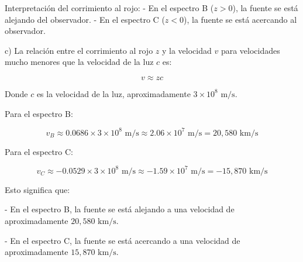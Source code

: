 \documentclass[12pt]{article}
\begin{document}
Interpretación del corrimiento al rojo:
- En el espectro B (\( z > 0 \)), la fuente se está alejando del observador.
- En el espectro C (\( z < 0 \)), la fuente se está acercando al observador.

c)
La relación entre el corrimiento al rojo \( z \) y la velocidad \( v \) para velocidades mucho menores que la velocidad de la luz \( c \) es:

\[
v \approx zc
\]

Donde \( c \) es la velocidad de la luz, aproximadamente \(3 \times 10^8 \text{ m/s}\).

Para el espectro B:

\[
v_B \approx 0.0686 \times 3 \times 10^8 \text{ m/s} \approx 2.06 \times 10^7 \text{ m/s} = 20,580 \text{ km/s}
\]

Para el espectro C:

\[
v_C \approx -0.0529 \times 3 \times 10^8 \text{ m/s} \approx -1.59 \times 10^7 \text{ m/s} = -15,870 \text{ km/s}
\]

Esto significa que:

- En el espectro B, la fuente se está alejando a una velocidad de aproximadamente \(20,580 \text{ km/s}\).

- En el espectro C, la fuente se está acercando a una velocidad de aproximadamente \(15,870 \text{ km/s}\).
\end{document}
